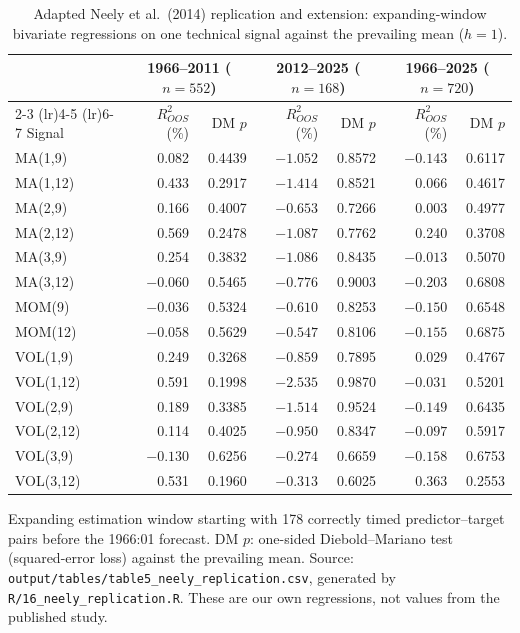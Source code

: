 \documentclass[11pt,a4paper]{article}
\begin{document}
\begin{table}[H]
\centering
\caption{Adapted Neely et al.\ (2014) replication and extension:
expanding-window bivariate regressions on one technical signal against the
prevailing mean ($h=1$).}
\label{tab:table5}
\normalsize
\begin{threeparttable}
\begin{tabular}{lrrrrrr}
\toprule
& \multicolumn{2}{c}{1966--2011 ($n=552$)} & \multicolumn{2}{c}{2012--2025 ($n=168$)} & \multicolumn{2}{c}{1966--2025 ($n=720$)} \\
\cmidrule(lr){2-3} \cmidrule(lr){4-5} \cmidrule(lr){6-7}
Signal & $R^2_{OOS}$ (\%) & DM $p$ & $R^2_{OOS}$ (\%) & DM $p$ & $R^2_{OOS}$ (\%) & DM $p$ \\
\midrule
MA(1,9)   & 0.082  & 0.4439 & $-1.052$ & 0.8572 & $-0.143$ & 0.6117 \\
MA(1,12)  & 0.433  & 0.2917 & $-1.414$ & 0.8521 & 0.066    & 0.4617 \\
MA(2,9)   & 0.166  & 0.4007 & $-0.653$ & 0.7266 & 0.003    & 0.4977 \\
MA(2,12)  & 0.569  & 0.2478 & $-1.087$ & 0.7762 & 0.240    & 0.3708 \\
MA(3,9)   & 0.254  & 0.3832 & $-1.086$ & 0.8435 & $-0.013$ & 0.5070 \\
MA(3,12)  & $-0.060$ & 0.5465 & $-0.776$ & 0.9003 & $-0.203$ & 0.6808 \\
MOM(9)    & $-0.036$ & 0.5324 & $-0.610$ & 0.8253 & $-0.150$ & 0.6548 \\
MOM(12)   & $-0.058$ & 0.5629 & $-0.547$ & 0.8106 & $-0.155$ & 0.6875 \\
VOL(1,9)  & 0.249  & 0.3268 & $-0.859$ & 0.7895 & 0.029    & 0.4767 \\
VOL(1,12) & 0.591  & 0.1998 & $-2.535$ & 0.9870 & $-0.031$ & 0.5201 \\
VOL(2,9)  & 0.189  & 0.3385 & $-1.514$ & 0.9524 & $-0.149$ & 0.6435 \\
VOL(2,12) & 0.114  & 0.4025 & $-0.950$ & 0.8347 & $-0.097$ & 0.5917 \\
VOL(3,9)  & $-0.130$ & 0.6256 & $-0.274$ & 0.6659 & $-0.158$ & 0.6753 \\
VOL(3,12) & 0.531  & 0.1960 & $-0.313$ & 0.6025 & 0.363    & 0.2553 \\
\bottomrule
\end{tabular}
\begin{tablenotes}
\normalsize
\item Expanding estimation window starting with 178 correctly timed predictor--target pairs before the 1966:01 forecast. DM $p$: one-sided Diebold--Mariano test (squared-error loss) against the prevailing mean. Source: \texttt{output/tables/table5\_neely\_replication.csv}, generated by \texttt{R/16\_neely\_replication.R}. These are our own regressions, not values from the published study.
\end{tablenotes}
\end{threeparttable}
\end{table}
\end{document}
